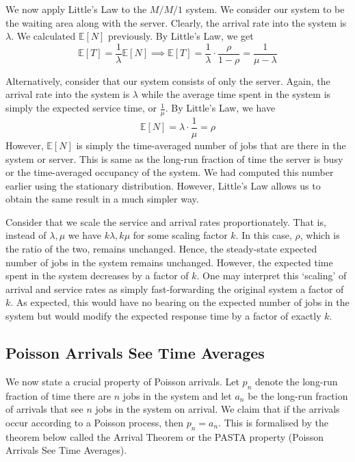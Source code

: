 \documentclass[12pt]{article}
\def\E{\mathbb{E}}
\theoremstyle{definition}
\begin{document}
We now apply Little's Law to the $M/M/1$ system. We consider our system to be the waiting area along with the server. Clearly, the arrival rate into the system is $\lambda$. We calculated $\E[N]$ previously. By Little's Law, we get
\[
    \E[T] = \frac{1}{\lambda} \E[N] \implies \boxed{\E[T] = \frac{1}{\lambda} \cdot \frac{\rho}{1-\rho} = \frac{1}{\mu - \lambda}}
\]

Alternatively, consider that our system consists of only the server. Again, the arrival rate into the system is $\lambda$ while the average time spent in the system is simply the expected service time, or $\frac{1}{\mu}$. By Little's Law, we have
\[
    \E[N] = \lambda \cdot \frac{1}{\mu} = \rho
\]
However, $\E[N]$ is simply the time-averaged number of jobs that are there in the system or server. This is same as the long-run fraction of time the server is busy or the time-averaged occupancy of the system. We had computed this number earlier using the stationary distribution. However, Little's Law allows us to obtain the same result in a much simpler way.

Consider that we scale the service and arrival rates proportionately. That is, instead of $\lambda, \mu$ we have $k\lambda, k\mu$ for some scaling factor $k$. In this case, $\rho$, which is the ratio of the two, remains unchanged. Hence, the steady-state expected number of jobs in the system remains unchanged. However, the expected time spent in the system decreases by a factor of $k$. One may interpret this `scaling' of arrival and service rates as simply fast-forwarding the original system a factor of $k$. As expected, this would have no bearing on the expected number of jobs in the system but would modify the expected response time by a factor of exactly $k$.

\subsection{Poisson Arrivals See Time Averages}

We now state a crucial property of Poisson arrivals. Let $p_n$ denote the long-run fraction of time there are $n$ jobs in the system and let $a_n$ be the long-run fraction of arrivals that see $n$ jobs in the system on arrival. We claim that if the arrivals occur according to a Poisson process, then $p_n = a_n$. This is formalised by the theorem below called the Arrival Theorem or the PASTA property (Poisson Arrivals See Time Averages). 
\end{document}
